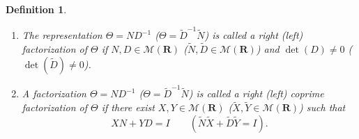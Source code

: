 \documentclass[11pt, a4paper]{amsart}
\newcommand{\inv}{^{-1}}
\newtheorem{defin}{Definition}
\newcommand{\matrices}[1]{\mathcal{M}\left( #1 \right)}		%
\newcommand{\Gen}{\Theta}									%
\newcommand{\num}{N}										%
\newcommand{\den}{D}										%
\newcommand{\lnum}{\widetilde{\num}}						%
\newcommand{\lden}{\widetilde{\den}}						%
\newcommand{\stable}{\mathbf{R}}							%
\begin{document}
\begin{defin}
\begin{enumerate}
\item The representation $\Gen=\num\den\inv $ ($\Gen=\lden\inv \lnum$) is called a right (left) factorization of $\Gen$ if $\num,\den\in\matrices{\stable}$ ($\lnum,\lden \in\matrices{\stable}$) and $\det(\den)\neq 0$ ($\det(\lden)\neq 0$).
\item A factorization $\Gen=\num\den\inv $ ($\Gen=\lden\inv \lnum$) is called \emph{a right (left) coprime factorization} of $\Gen$ if there exist $X,Y\in\matrices{\stable}$ ($\widetilde{X},\widetilde{Y}\in\matrices{\stable}$) such that
$$
X\num+Y\den=I \qquad (\lnum \widetilde{X}+ \lden\widetilde{Y}=I).
$$
\end{enumerate}
\end{defin}
\end{document}
